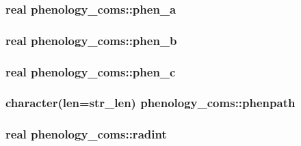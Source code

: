 \subsubsection[{\texorpdfstring{phen\+\_\+a}{phen_a}}]{\setlength{\rightskip}{0pt plus 5cm}real phenology\+\_\+coms\+::phen\+\_\+a}\hypertarget{namespacephenology__coms_a68b65a488b28872a9aca9fed46ba4eaf}{}\label{namespacephenology__coms_a68b65a488b28872a9aca9fed46ba4eaf}
\subsubsection[{\texorpdfstring{phen\+\_\+b}{phen_b}}]{\setlength{\rightskip}{0pt plus 5cm}real phenology\+\_\+coms\+::phen\+\_\+b}\hypertarget{namespacephenology__coms_add9263a2bb7374fee2ecef8d4ec4f53c}{}\label{namespacephenology__coms_add9263a2bb7374fee2ecef8d4ec4f53c}
\subsubsection[{\texorpdfstring{phen\+\_\+c}{phen_c}}]{\setlength{\rightskip}{0pt plus 5cm}real phenology\+\_\+coms\+::phen\+\_\+c}\hypertarget{namespacephenology__coms_a8aee741f7b4cfd7e550ca881a5b4e7fc}{}\label{namespacephenology__coms_a8aee741f7b4cfd7e550ca881a5b4e7fc}
\subsubsection[{\texorpdfstring{phenpath}{phenpath}}]{\setlength{\rightskip}{0pt plus 5cm}character(len=str\+\_\+len) phenology\+\_\+coms\+::phenpath}\hypertarget{namespacephenology__coms_a533c334911241cc02bef0ae05f5e1adc}{}\label{namespacephenology__coms_a533c334911241cc02bef0ae05f5e1adc}
\subsubsection[{\texorpdfstring{radint}{radint}}]{\setlength{\rightskip}{0pt plus 5cm}real phenology\+\_\+coms\+::radint}\hypertarget{namespacephenology__coms_aa7a0cd40eeb581ef9fd19cb3d4307482}{}\label{namespacephenology__coms_aa7a0cd40eeb581ef9fd19cb3d4307482}
